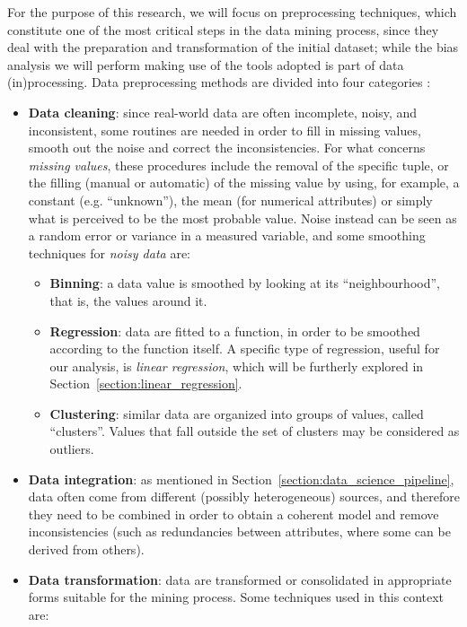 For the purpose of this research, we will focus on preprocessing techniques, which constitute one of the most critical steps in the data mining process, since they deal with the preparation and transformation of the initial dataset; while the bias analysis we will perform making use of the tools adopted is part of data (in)processing. Data preprocessing methods are divided into four categories \cite{tamilselvi2015efficient}:
\begin{itemize}
\item \textbf{Data cleaning}: since real-world data are often incomplete, noisy, and inconsistent, some routines are needed in order to fill in missing values, smooth out the noise and correct the inconsistencies.
For what concerns \textit{missing values}, these procedures include the removal of the specific tuple, or the filling (manual or automatic) of the missing value by using, for example, a constant (e.g. ``unknown''), the mean (for numerical attributes) or simply what is perceived to be the most probable value.
Noise instead can be seen as a random error or variance in a measured variable, and some smoothing techniques for \textit{noisy data} are:
\begin{itemize}
\item \textbf{Binning}: a data value is smoothed by looking at its ``neighbourhood'', that is, the values around it.
\item \textbf{Regression}: data are fitted to a function, in order to be smoothed according to the function itself. A specific type of regression, useful for our analysis, is \textit{linear regression}, which will be furtherly explored in Section~\ref{section:linear_regression}.
\item \textbf{Clustering}: similar data are organized into groups of values, called ``clusters''. Values that fall outside the set of clusters may be considered as outliers.
\end{itemize}
\item \textbf{Data integration}: as mentioned in Section~\ref{section:data_science_pipeline}, data often come from different (possibly heterogeneous) sources, and therefore they need to be combined in order to obtain a coherent model and remove inconsistencies (such as redundancies between attributes, where some can be derived from others).
\item \textbf{Data transformation}: data are transformed or consolidated in appropriate forms suitable for the mining process. Some techniques used in this context are:
\begin{itemize}

\end{itemize}
\end{itemize}
